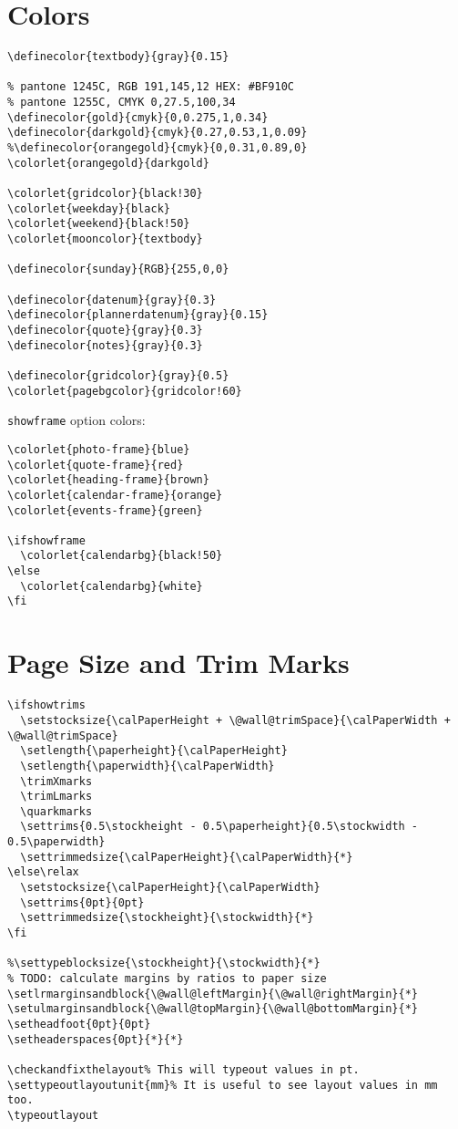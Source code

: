 \documentclass[11pt,oneside]{memoir-article}
\begin{document}
\section{Colors}
\label{sec:orgf0949c8}

\begin{verbatim}
\definecolor{textbody}{gray}{0.15}

% pantone 1245C, RGB 191,145,12 HEX: #BF910C
% pantone 1255C, CMYK 0,27.5,100,34
\definecolor{gold}{cmyk}{0,0.275,1,0.34}
\definecolor{darkgold}{cmyk}{0.27,0.53,1,0.09}
%\definecolor{orangegold}{cmyk}{0,0.31,0.89,0}
\colorlet{orangegold}{darkgold}

\colorlet{gridcolor}{black!30}
\colorlet{weekday}{black}
\colorlet{weekend}{black!50}
\colorlet{mooncolor}{textbody}

\definecolor{sunday}{RGB}{255,0,0}

\definecolor{datenum}{gray}{0.3}
\definecolor{plannerdatenum}{gray}{0.15}
\definecolor{quote}{gray}{0.3}
\definecolor{notes}{gray}{0.3}

\definecolor{gridcolor}{gray}{0.5}
\colorlet{pagebgcolor}{gridcolor!60}
\end{verbatim}

\texttt{showframe} option colors:

\begin{verbatim}
\colorlet{photo-frame}{blue}
\colorlet{quote-frame}{red}
\colorlet{heading-frame}{brown}
\colorlet{calendar-frame}{orange}
\colorlet{events-frame}{green}

\ifshowframe
  \colorlet{calendarbg}{black!50}
\else
  \colorlet{calendarbg}{white}
\fi
\end{verbatim}

\section{Page Size and Trim Marks}
\label{sec:orgb8c3577}

\begin{verbatim}
\ifshowtrims
  \setstocksize{\calPaperHeight + \@wall@trimSpace}{\calPaperWidth + \@wall@trimSpace}
  \setlength{\paperheight}{\calPaperHeight}
  \setlength{\paperwidth}{\calPaperWidth}
  \trimXmarks
  \trimLmarks
  \quarkmarks
  \settrims{0.5\stockheight - 0.5\paperheight}{0.5\stockwidth - 0.5\paperwidth}
  \settrimmedsize{\calPaperHeight}{\calPaperWidth}{*}
\else\relax
  \setstocksize{\calPaperHeight}{\calPaperWidth}
  \settrims{0pt}{0pt}
  \settrimmedsize{\stockheight}{\stockwidth}{*}
\fi

%\settypeblocksize{\stockheight}{\stockwidth}{*}
% TODO: calculate margins by ratios to paper size
\setlrmarginsandblock{\@wall@leftMargin}{\@wall@rightMargin}{*}
\setulmarginsandblock{\@wall@topMargin}{\@wall@bottomMargin}{*}
\setheadfoot{0pt}{0pt}
\setheaderspaces{0pt}{*}{*}

\checkandfixthelayout% This will typeout values in pt.
\settypeoutlayoutunit{mm}% It is useful to see layout values in mm too.
\typeoutlayout
\end{verbatim}
\end{document}
